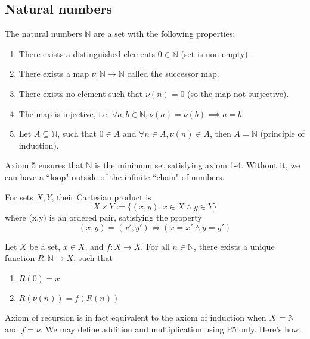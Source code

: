 \documentclass[11pt]{article}
\begin{document}
\subsection{Natural numbers}
\begin{axiom}
  The natural numbers \(\mathbb{N}\) are a set with the following properties:
  \begin{enumerate}[label={(P\arabic*)}]
    \item There exists a distinguished elements \(0 \in \mathbb{N}\) (set is non-empty).
    \item There exists a map \(\nu : \mathbb{N} \rightarrow \mathbb{N}\) called the successor map.
    \item There exists no element such that \(\nu (n) = 0\) (so the map not surjective).
    \item The map is injective, i.e. \(\forall a,b \in \mathbb{N}, \nu (a) = \nu (b) \implies a=b\).
    \item Let \(A \subseteq \mathbb{N}\), such that \(0 \in A\) and \(\forall n \in A, \nu (n) \in A\), then \(A=\mathbb{N}\) (principle of induction).
  \end{enumerate}
\end{axiom}
Axiom 5 ensures that \(\mathbb{N}\) is the minimum set satisfying axiom 1-4. Without it, we can have a ``loop" outside of the infinite ``chain" of numbers. 

\begin{definition}
  For sets \(X, Y\), their Cartesian product is
  \begin{equation*}
    X \times Y := \{(x,y) : x \in X \land y \in Y\}
  \end{equation*}
  where (x,y) is an ordered pair, satisfying the property
  \begin{equation*}
    (x,y) = (x',y') \iff (x=x' \land y=y')
  \end{equation*}
\end{definition}

\begin{axiom}
  Let \(X\) be a set, \(x \in X\), and \(f:X \rightarrow X\). For all \(n \in \mathbb{N}\), there exists a unique function \(R:\mathbb{N} \rightarrow X\), such that
  \begin{enumerate}
    \item \(R(0) = x\)
    \item \(R(\nu (n)) = f(R(n))\)
  \end{enumerate}
\end{axiom}
\begin{remark}
  Axiom of recursion is in fact equivalent to the axiom of induction when \(X=\mathbb{N}\) and \(f=\nu \). We may define addition and multiplication using P5 only. Here's how.
\end{remark}
\begin{solution}
\end{solution}
\end{document}
